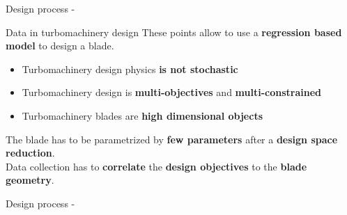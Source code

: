 \begin{frame}{Design process - }
\end{frame}

\begin{frame}{Data in turbomachinery design}
    \vspace{0.5cm}
    These points allow to use a \textbf{regression based model} to design a blade.
    \vspace{0.5cm}
    \begin{itemize}
        \setlength{\itemsep}{15pt}
        \item Turbomachinery design physics \textbf{is not stochastic}
        \item Turbomachinery design is \textbf{multi-objectives} and \textbf{multi-constrained}
        \item Turbomachinery blades are \textbf{high dimensional objects}
    \end{itemize}
    \vspace{0.5cm}
    The blade has to be parametrized by \textbf{few parameters} after a \textbf{design space reduction}. \\
    
    \vspace{0.5cm}
    Data collection has to \textbf{correlate} the \textbf{design objectives} to the \textbf{blade geometry}.
\end{frame}

\begin{frame}{Design process - }
    \begin{figure}
        \centering
        
    \end{figure}
\end{frame}

